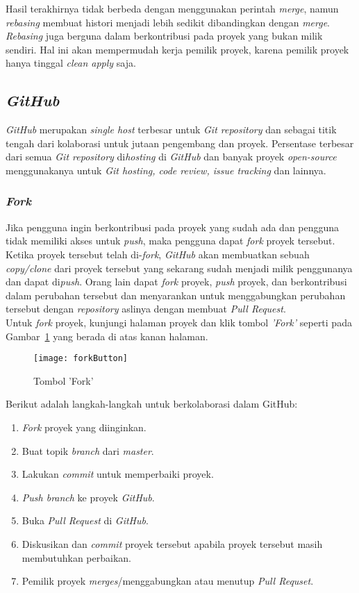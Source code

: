 Hasil terakhirnya tidak berbeda dengan menggunakan perintah \textit{merge}, namun \textit{rebasing} membuat histori menjadi lebih sedikit dibandingkan dengan \textit{merge}. \textit{Rebasing} juga berguna dalam berkontribusi pada proyek yang bukan milik sendiri. Hal ini akan mempermudah kerja pemilik proyek, karena pemilik proyek hanya tinggal \textit{clean apply} saja. 

\subsection{\textit{GitHub}}
\textit{GitHub} merupakan \textit{single host} terbesar untuk \textit{Git repository} dan sebagai titik tengah dari kolaborasi untuk jutaan pengembang dan proyek. Persentase terbesar dari semua \textit{Git repository} di\textit{hosting} di \textit{GitHub} dan banyak proyek \textit{open-source} menggunakanya untuk \textit{Git hosting, code review, issue tracking} dan lainnya. 

\subsubsection{\textit{Fork}}
Jika pengguna ingin berkontribusi pada proyek yang sudah ada dan pengguna tidak memiliki akses untuk \textit{push}, maka pengguna dapat \textit{fork} proyek tersebut. Ketika proyek tersebut telah di-\textit{fork}, \textit{GitHub} akan membuatkan sebuah \textit{copy/clone} dari proyek tersebut yang sekarang sudah menjadi milik penggunanya dan dapat di\textit{push}. Orang lain dapat \textit{fork} proyek, \textit{push} proyek, dan berkontribusi dalam perubahan tersebut dan menyarankan untuk menggabungkan perubahan tersebut dengan \textit{repository} aslinya dengan membuat \textit{Pull Request}.\\

Untuk \textit{fork} proyek, kunjungi halaman proyek dan klik tombol \textit{'Fork'} seperti pada Gambar~\ref{fig:forkButton} yang berada di atas kanan halaman. 

\begin{figure}[H]
	\centering  
	\texttt{[image: forkButton]}  
	\caption[Tombol 'Fork']{Tombol 'Fork'}
	\label{fig:forkButton} 
\end{figure}

Berikut adalah langkah-langkah untuk berkolaborasi dalam GitHub: 

\begin{enumerate}
	\item \textit{Fork} proyek yang diinginkan.
	\item Buat topik \textit{branch} dari \textit{master}.
	\item Lakukan \textit{commit} untuk memperbaiki proyek.
	\item \textit{Push branch} ke proyek \textit{GitHub}.
	\item Buka \textit{Pull Request} di \textit{GitHub}.
	\item Diskusikan dan \textit{commit} proyek tersebut apabila proyek tersebut masih membutuhkan perbaikan.
	\item Pemilik proyek \textit{merges}/menggabungkan atau menutup \textit{Pull Requset}.
\end{enumerate}

